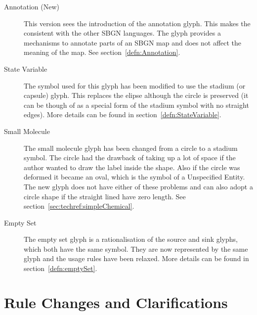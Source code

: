 \begin{description}
\item[Annotation (New)] This version sees the introduction of the annotation glyph. This makes the \PDl consistent with the other SBGN languages. The glyph provides a mechanisms to annotate parts of an SBGN map and does not affect the meaning of the map. See section~\ref{defn:Annotation}.
\item[State Variable] The symbol used for this glyph has been modified to use the stadium (or capsule) glyph. This replaces the elipse although the circle is preserved (it can be though of as a special form of the stadium symbol with no straight edges). More details can be found in section~\ref{defn:StateVariable}.
\item[Small Molecule] The small molecule glyph has been changed from a circle to a stadium symbol. The circle had the drawback of taking up a lot of space if the author wanted to draw the label inside the shape. Also if the circle was deformed it became an oval, which is the symbol of a Unspecified Entity. The new glyph does not have either of these problems and can also adopt a circle shape if the straight lined have zero length. See section~\ref{sec:techref:simpleChemical}.
\item[Empty Set] The empty set glyph is a rationalisation of the source and sink glyphs, which both have the same symbol. They are now represented by the same glyph and the usage rules have been relaxed. More details can be found in section~\ref{defn:emptySet}.
\end{description}


\section{Rule Changes and Clarifications}

